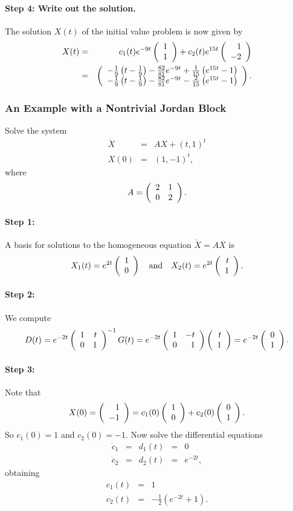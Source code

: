 \documentclass{ximera}
\begin{document}
\paragraph{Step 4: Write out the solution.}  The solution $X(t)$ of the 
initial value problem  is now given by
\begin{eqnarray*}
X(t) & = & c_1(t)e^{-9t}\left(\begin{array}{r} 1 \\ 1\end{array}\right) + c_2(t)e^{15t}\left(\begin{array}{r} 1 \\ -2\end{array}\right) \\
& = &  \left(\begin{array}{c}
-\frac{1}{9}\left(t-\frac{1}{9}\right)-
\frac{82}{81}e^{-9t}+\frac{1}{15}\left( e^{15t}-1\right)\\
-\frac{1}{9}\left(t-\frac{1}{9}\right)-
\frac{82}{81}e^{-9t}-\frac{2}{15}\left( e^{15t}-1\right)
\end{array}\right).
\end{eqnarray*}

\subsubsection*{An Example with a Nontrivial Jordan Block}

Solve the system
\begin{equation}  \label{e:2djb}
\begin{array}{rcl}
\dot{X} & = & A X + (t,1)^t \\
X(0) & = & (1,-1)^t,
\end{array}
\end{equation}
where 
\[
A = \left(\begin{array}{rr} 2 & 1\\ 0 &2\end{array}\right).
\]

\paragraph{Step 1:}  A basis for solutions to the homogeneous equation 
$\dot{X}=AX$ is
\[
X_1(t) = e^{2t}\left(\begin{array}{r} 1 \\ 0\end{array}\right) \quad\mbox{and}\quad X_2(t) = e^{2t}\left(\begin{array}{r} t \\ 1\end{array}\right).
\]

\paragraph{Step 2:}  We compute
\[
D(t) =  e^{-2t}\left(\begin{array}{rr} 1 & t\\ 0 &1\end{array}\right)^{-1} G(t) = 
e^{-2t}\left(\begin{array}{rr} 1 & -t\\ 0 &1\end{array}\right)\left(\begin{array}{r} t \\ 1\end{array}\right) = e^{-2t}\left(\begin{array}{r} 0 \\ 1\end{array}\right).
\]

\paragraph{Step 3:}  Note that 
\[
X(0) = \left(\begin{array}{r} 1 \\ -1\end{array}\right) = c_1(0)\left(\begin{array}{r} 1 \\ 0\end{array}\right) + c_2(0)\left(\begin{array}{r} 0 \\ 1\end{array}\right).
\]
So $c_1(0)=1$ and $c_2(0)=-1$.  Now solve the differential equations
\[
\begin{array}{rclcl}
\dot{c}_1 & = & d_1(t) & = & 0 \\
\dot{c}_2 & = & d_2(t) & = & e^{-2t},
\end{array}
\]
obtaining
\begin{eqnarray*}
c_1(t) & = & 1 \\
c_2(t) & = & -\frac{1}{2}(e^{-2t}+1).
\end{eqnarray*}
\end{document}
